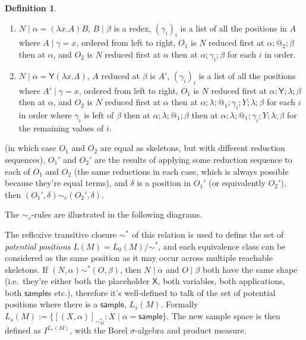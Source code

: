 \documentclass{article}
\newcommand{\tY}{\mathsf{Y}}
\newcommand{\tsample}{\mathsf{sample}}
\newcommand{\skeletonPlaceholder}{\mathsf{X}} %
\theoremstyle{definition}
\newtheorem{definition}{Definition}
\theoremstyle{lemma}
\theoremstyle{remark}
\begin{document}
\begin{definition}
\begin{enumerate}
\begin{enumerate}
        \item $N \mid \alpha = (\lambda x. A) B$, $B \mid \beta$ is a redex, $(\gamma_i)_i$ is a list of all the positions in $A$ where $A \mid \gamma = x$, ordered from left to right, $O_1$ is $N$ reduced first at $\alpha ; @_2 ; \beta$ then at $\alpha$, and $O_2$ is $N$ reduced first at $\alpha$ then at $\alpha;\gamma_i;\beta$ for each $i$ in order.
        
        \item $N \mid \alpha = \tY (\lambda x. A)$, $A$ reduced at $\beta$ is $A'$, $(\gamma_i)_i$ is a list of all the positions where $A' \mid \gamma  = x$, ordered from left to right, $O_1$ is $N$ reduced first at $\alpha;\tY;\lambda;\beta$ then at $\alpha$, and $O_2$ is $N$ reduced first at $\alpha$ then at $\alpha;\lambda;@_1;\gamma_i;Y;\lambda;\beta$ for each $i$ in order where $\gamma_i$ is left of $\beta$ then at $\alpha;\lambda;@_1;\beta$ then at $\alpha;\lambda;@_1;\gamma_i;Y;\lambda;\beta$ for the remaining values of $i$.
    \end{enumerate}
    (in which case $O_1$ and $O_2$ are equal as skeletons, but with different reduction sequences), $O_1'$ and $O_2'$ are the results of applying some reduction sequence to each of $O_1$ and $O_2$ (the same reductions in each case, which is always possible because they're equal terms), and $\delta$ is a position in $O_1'$ (or equivalently $O_2'$), then $(O_1',\delta) \sim_c (O_2',\delta)$.
\end{enumerate}
The $\sim_c$-rules are illustrated in the following diagrams.
\end{definition}




The reflexive transitive closure $\sim^*$ of this relation is used to define the set of \emph{potential positions} $L(M) = L_0(M) / \sim^*$, and each equivalence class can be considered as the same position as it may occur across multiple reachable skeletons. 
If $(N,\alpha) \sim^* (O,\beta)$, then $N \mid \alpha$ and $O \mid \beta$ both have the same shape (i.e.~they're either both the placeholder $\skeletonPlaceholder$, both variables, both applications, both $\tsample$s etc.), therefore it's well-defined to talk of the set of potential positions where there is a $\tsample$, $L_s(M)$. 
Formally $L_s(M) := \{[(X, \alpha)]_{\sim^\ast_M} : X \mid \alpha = \tsample\}$.
The new sample space is then defined as $I^{L_s(M)}$, with the Borel $\sigma$-algebra and product measure.
\end{document}
